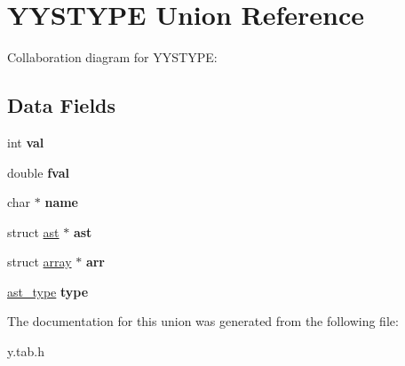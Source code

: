 \hypertarget{union_y_y_s_t_y_p_e}{}\section{Y\+Y\+S\+T\+Y\+PE Union Reference}
\label{union_y_y_s_t_y_p_e}


Collaboration diagram for Y\+Y\+S\+T\+Y\+PE\+:
\subsection*{Data Fields}
\begin{DoxyCompactItemize}
\item 
\mbox{\label{union_y_y_s_t_y_p_e_aa0ccb5ee6d882ee3605ff47745c6467b}} 
int {\bfseries val}
\item 
\mbox{\label{union_y_y_s_t_y_p_e_af314defce1ac19638fde2b8796721fe3}} 
double {\bfseries fval}
\item 
\mbox{\label{union_y_y_s_t_y_p_e_a5ac083a645d964373f022d03df4849c8}} 
char $\ast$ {\bfseries name}
\item 
\mbox{\label{union_y_y_s_t_y_p_e_a6f86583d363dbc890ff3408ea74d7c15}} 
struct \hyperlink{structast}{ast} $\ast$ {\bfseries ast}
\item 
\mbox{\label{union_y_y_s_t_y_p_e_a32bffb8438553e70cd9da0ebdb4dc14d}} 
struct \hyperlink{structarray}{array} $\ast$ {\bfseries arr}
\item 
\mbox{\label{union_y_y_s_t_y_p_e_a8321fc8e556a418583dd74ee9fcc2bf7}} 
\hyperlink{ast_8h_a77091c187ac9a89404fac2e8226daef3}{ast\+\_\+type} {\bfseries type}
\end{DoxyCompactItemize}


The documentation for this union was generated from the following file\+:\begin{DoxyCompactItemize}
\item 
y.\+tab.\+h\end{DoxyCompactItemize}
